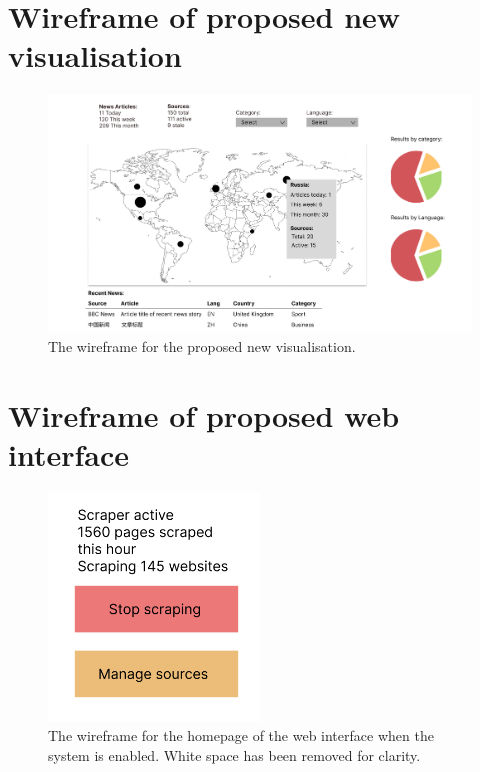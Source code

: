 \documentclass{l4proj}
\begin{document}
\begin{appendices}
\chapter{Wireframe of proposed new visualisation}
\label{appendix:visualisation-wireframe}
 \begin{figure}[h]
\centering
\includegraphics[width=\textwidth]{images/visualisation-wireframe.png}
\caption{The wireframe for the proposed new visualisation.}
\label{fig:visualisation-wireframe}
\end{figure}


\chapter{Wireframe of proposed web interface}
\label{appendix:interface-wireframe}

 \begin{figure}[h]
\centering
\includegraphics[width=0.5\textwidth]{images/wireframe-home-1.png}
\caption{The wireframe for the homepage of the web interface when the system is enabled. White space has been removed for clarity.}
\label{fig:interface-wireframe}
\end{figure}


\end{appendices}
\end{document}
